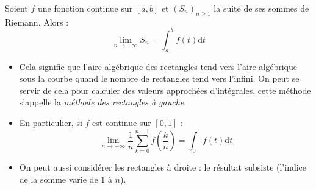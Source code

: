 \documentclass[french,11pt,twoside]{VcCours}
\newcommand{\dx}{\text{d}x}
\newcommand{\dt}{\text{d}t}
\newcommand{\Sum}[2]{\sum_{#1}^{#2}}
\begin{document}
\begin{center}
\end{center}

\medskip

\begin{Theoreme}{}
Soient $f$ une fonction continue sur $[a,b]$ et $(S_n)_{n \geq 1}$ la suite de ses sommes de Riemann. Alors : 
 $$ \lim_{n\to +\infty} S_n =  \int_a^b f(t) \dt$$
\end{Theoreme}


\begin{Remarques}{}
\begin{itemize}
\item Cela signifie que l'aire algébrique des rectangles tend vers l'aire algébrique sous la courbe quand le nombre de rectangles tend vers l'infini. On peut se servir de cela pour calculer des valeurs approchées d'intégrales, cette méthode s'appelle la \textit{méthode des rectangles à gauche}.
\item En particulier, si $f$ est continue sur $[0,1]$ :
$$ \lim_{n\to +\infty} \frac 1n \sum_{k=0}^{n-1} f\left(\frac kn\right) = \int_0^1 f(t) \dt$$ 
\item On peut aussi considérer les rectangles \og à droite \fg : le résultat subsiste (l'indice de la somme varie de $1$ à $n$).
\end{itemize}
\end{Remarques}

%
\end{document}
